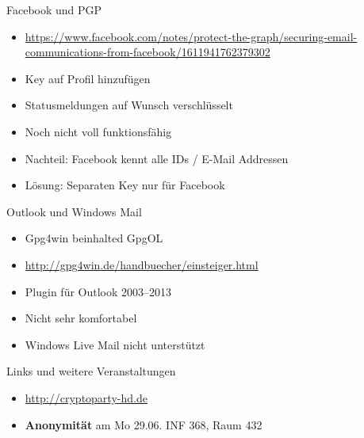 \begin{frame}{Facebook und PGP}
	\begin{itemize}
		\item \url{https://www.facebook.com/notes/protect-the-graph/securing-email-communications-from-facebook/1611941762379302}
		\item Key auf Profil hinzufügen
		\item Statusmeldungen auf Wunsch verschlüsselt
		\item Noch nicht voll funktionsfähig
		\item Nachteil: Facebook kennt alle IDs / E-Mail Addressen
		\item Lösung: Separaten Key nur für Facebook
	\end{itemize}
\end{frame}

\begin{frame}{Outlook und Windows Mail}
	\begin{itemize}
		\item Gpg4win beinhalted GpgOL
		\item \url{http://gpg4win.de/handbuecher/einsteiger.html}
		\item Plugin für Outlook 2003--2013
		\item Nicht sehr komfortabel
		\item Windows Live Mail nicht unterstützt
	\end{itemize}
\end{frame}

\begin{frame}{Links und weitere Veranstaltungen}
	\begin{itemize}
		\item \url{http://cryptoparty-hd.de} \\[10pt]
		\item \textbf{Anonymität} am Mo 29.06. INF 368, Raum 432
	\end{itemize}
\end{frame}

